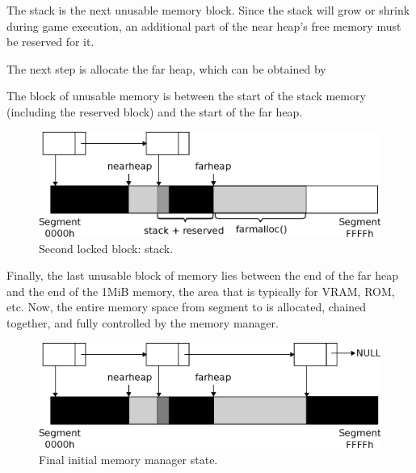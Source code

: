 \documentclass[book.tex]{subfiles}
\begin{document}
\par
The stack is the next unusable memory block. Since the stack will grow or shrink during game execution, an additional part of the near heap’s free memory must be reserved for it.\\

\par

\par  

The next step is allocate the far heap, which can be obtained by\\

\par

\par 

The block of unusable memory is between the start of the stack memory (including the reserved block) and the start of the far heap. \\

\begin{figure}[H]
\centering
 \includegraphics[width=\textwidth]{imgs/drawings/mm_stack.eps}
 \caption{Second locked block: stack.}
 \end{figure}
 \par

\par
Finally, the last unusable block of memory lies between the end of the far heap and the end of the 1MiB memory, the area that is typically for VRAM, ROM, etc. Now, the entire memory space from segment  to  is allocated, chained together, and fully controlled by the memory manager.\\

\begin{figure}[H]
\centering
 \includegraphics[width=\textwidth]{imgs/drawings/mm_final.eps}
 \caption{Final initial memory manager state.}
 \end{figure}
\end{document}

